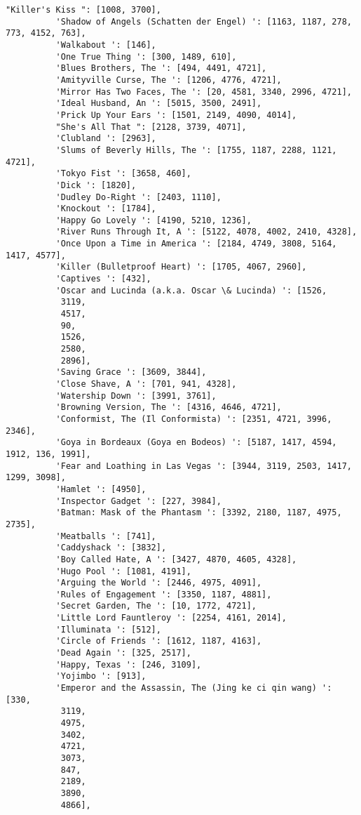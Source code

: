 \documentclass[11pt]{article}
\begin{document}
\begin{Verbatim}[commandchars=\\\{\}]
          "Killer's Kiss ": [1008, 3700],
          'Shadow of Angels (Schatten der Engel) ': [1163, 1187, 278, 773, 4152, 763],
          'Walkabout ': [146],
          'One True Thing ': [300, 1489, 610],
          'Blues Brothers, The ': [494, 4491, 4721],
          'Amityville Curse, The ': [1206, 4776, 4721],
          'Mirror Has Two Faces, The ': [20, 4581, 3340, 2996, 4721],
          'Ideal Husband, An ': [5015, 3500, 2491],
          'Prick Up Your Ears ': [1501, 2149, 4090, 4014],
          "She's All That ": [2128, 3739, 4071],
          'Clubland ': [2963],
          'Slums of Beverly Hills, The ': [1755, 1187, 2288, 1121, 4721],
          'Tokyo Fist ': [3658, 460],
          'Dick ': [1820],
          'Dudley Do-Right ': [2403, 1110],
          'Knockout ': [1784],
          'Happy Go Lovely ': [4190, 5210, 1236],
          'River Runs Through It, A ': [5122, 4078, 4002, 2410, 4328],
          'Once Upon a Time in America ': [2184, 4749, 3808, 5164, 1417, 4577],
          'Killer (Bulletproof Heart) ': [1705, 4067, 2960],
          'Captives ': [432],
          'Oscar and Lucinda (a.k.a. Oscar \& Lucinda) ': [1526,
           3119,
           4517,
           90,
           1526,
           2580,
           2896],
          'Saving Grace ': [3609, 3844],
          'Close Shave, A ': [701, 941, 4328],
          'Watership Down ': [3991, 3761],
          'Browning Version, The ': [4316, 4646, 4721],
          'Conformist, The (Il Conformista) ': [2351, 4721, 3996, 2346],
          'Goya in Bordeaux (Goya en Bodeos) ': [5187, 1417, 4594, 1912, 136, 1991],
          'Fear and Loathing in Las Vegas ': [3944, 3119, 2503, 1417, 1299, 3098],
          'Hamlet ': [4950],
          'Inspector Gadget ': [227, 3984],
          'Batman: Mask of the Phantasm ': [3392, 2180, 1187, 4975, 2735],
          'Meatballs ': [741],
          'Caddyshack ': [3832],
          'Boy Called Hate, A ': [3427, 4870, 4605, 4328],
          'Hugo Pool ': [1081, 4191],
          'Arguing the World ': [2446, 4975, 4091],
          'Rules of Engagement ': [3350, 1187, 4881],
          'Secret Garden, The ': [10, 1772, 4721],
          'Little Lord Fauntleroy ': [2254, 4161, 2014],
          'Illuminata ': [512],
          'Circle of Friends ': [1612, 1187, 4163],
          'Dead Again ': [325, 2517],
          'Happy, Texas ': [246, 3109],
          'Yojimbo ': [913],
          'Emperor and the Assassin, The (Jing ke ci qin wang) ': [330,
           3119,
           4975,
           3402,
           4721,
           3073,
           847,
           2189,
           3890,
           4866],

\end{Verbatim}
\end{document}
